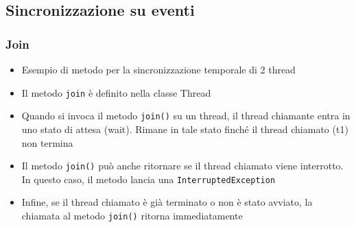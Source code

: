 \subsection{Sincronizzazione su eventi}
\subsubsection{Join}
\begin{itemize}
    \item Esempio di metodo per la sincronizzazione temporale di 2 thread
    \item Il metodo \verb#join# è definito nella classe Thread 
    \item Quando si invoca il metodo \verb#join()# su un thread, il thread chiamante entra in uno stato di attesa (wait). Rimane in tale stato finché il thread chiamato (t1) non termina
    \item Il metodo \verb#join()# può anche ritornare se il thread chiamato viene interrotto. In questo caso, il metodo lancia una \verb#InterruptedException#
    \item Infine, se il thread chiamato è già terminato o non è stato avviato, la chiamata al metodo \verb#join()# ritorna immediatamente
\end{itemize}
